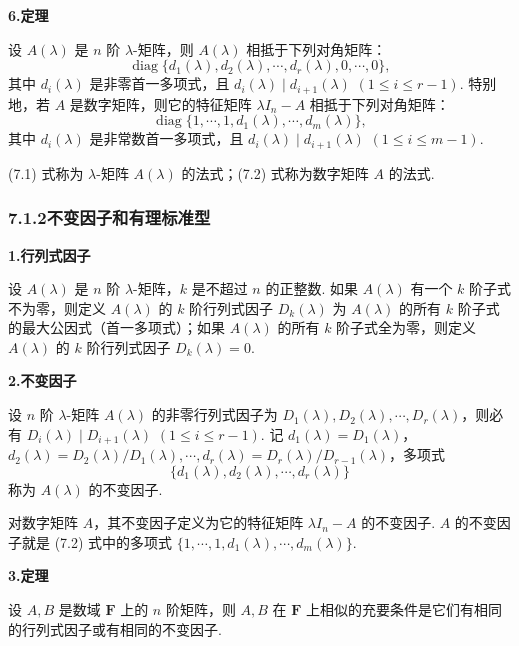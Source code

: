 \documentclass[UTF8,12pt,a4paper,fontset=fandol]{ctexart}
\begin{document}
\noindent\textbf{6.\quad 定理}

设 $A(\lambda)$ 是 $n$ 阶 $\lambda$-矩阵，则 $A(\lambda)$ 相抵于下列对角矩阵：
\begin{equation}
\operatorname{diag}\{d_1(\lambda),d_2(\lambda),\cdots,d_r(\lambda),0,\cdots,0\},
\tag{7.1}
\end{equation}
其中 $d_i(\lambda)$ 是非零首一多项式，且 $d_i(\lambda)\mid d_{i+1}(\lambda)$ $(1\le i\le r-1)$. 特别地，若 $A$ 是数字矩阵，则它的特征矩阵 $\lambda I_n-A$ 相抵于下列对角矩阵：
\begin{equation}
\operatorname{diag}\{1,\cdots,1,d_1(\lambda),\cdots,d_m(\lambda)\},
\tag{7.2}
\end{equation}
其中 $d_i(\lambda)$ 是非常数首一多项式，且 $d_i(\lambda)\mid d_{i+1}(\lambda)$ $(1\le i\le m-1)$.

(7.1) 式称为 $\lambda$-矩阵 $A(\lambda)$ 的法式；(7.2) 式称为数字矩阵 $A$ 的法式.

\subsubsection*{7.1.2\quad 不变因子和有理标准型}

\noindent\textbf{1.\quad 行列式因子}

设 $A(\lambda)$ 是 $n$ 阶 $\lambda$-矩阵，$k$ 是不超过 $n$ 的正整数. 如果 $A(\lambda)$ 有一个 $k$ 阶子式不为零，则定义 $A(\lambda)$ 的 $k$ 阶行列式因子 $D_k(\lambda)$ 为 $A(\lambda)$ 的所有 $k$ 阶子式的最大公因式（首一多项式）；如果 $A(\lambda)$ 的所有 $k$ 阶子式全为零，则定义 $A(\lambda)$ 的 $k$ 阶行列式因子 $D_k(\lambda)=0$.

\noindent\textbf{2.\quad 不变因子}

设 $n$ 阶 $\lambda$-矩阵 $A(\lambda)$ 的非零行列式因子为 $D_1(\lambda),D_2(\lambda),\cdots,D_r(\lambda)$，则必有 $D_i(\lambda)\mid D_{i+1}(\lambda)$ $(1\le i\le r-1)$. 记 $d_1(\lambda)=D_1(\lambda)$，$d_2(\lambda)=D_2(\lambda)/D_1(\lambda),\cdots,d_r(\lambda)=D_r(\lambda)/D_{r-1}(\lambda)$，多项式
\[
\{d_1(\lambda),d_2(\lambda),\cdots,d_r(\lambda)\}
\]
称为 $A(\lambda)$ 的不变因子.

对数字矩阵 $A$，其不变因子定义为它的特征矩阵 $\lambda I_n-A$ 的不变因子. $A$ 的不变因子就是 (7.2) 式中的多项式 $\{1,\cdots,1,d_1(\lambda),\cdots,d_m(\lambda)\}$.

\noindent\textbf{3.\quad 定理}

设 $A,B$ 是数域 $\mathbf{F}$ 上的 $n$ 阶矩阵，则 $A,B$ 在 $\mathbf{F}$ 上相似的充要条件是它们有相同的行列式因子或有相同的不变因子.
\end{document}
